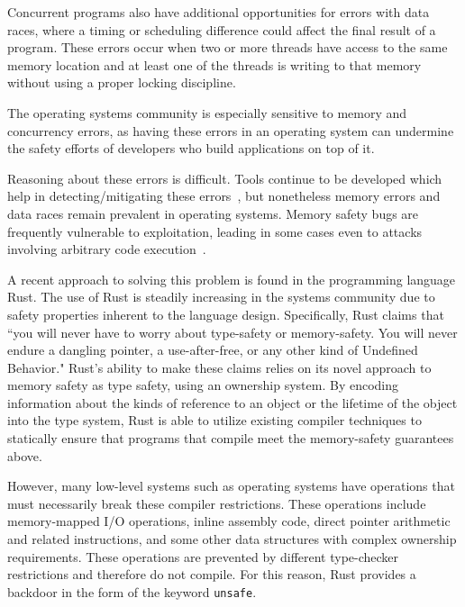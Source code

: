 \documentclass[12pt]{article}
\begin{document}
Concurrent programs also have additional opportunities for errors with data races, where a timing or scheduling difference could affect the final result of a program. These errors occur when two or more threads have access to the same memory location and at least one of the threads is writing to that memory without using a proper locking discipline\cite{placeholder}. 

The operating systems community is especially sensitive to memory and concurrency errors, as having these errors in an operating system can undermine the safety efforts of developers who build applications on top of it.

Reasoning about these errors is difficult. Tools continue to be developed which help in detecting/mitigating these errors~\cite{criswell2009memory, kuvaiskii2017sgxbounds, seyster2011redflag}, but nonetheless memory errors and data races remain prevalent in operating systems. Memory safety bugs are frequently vulnerable to exploitation, leading in some cases even to attacks involving arbitrary code execution~\cite{android_vulnerabilities, shacham2007geometry}.

A recent approach to solving this problem is found in the programming language Rust. The use of Rust is steadily increasing in the systems community due to safety properties inherent to the language design. Specifically, Rust claims that
``you will never have to worry about type-safety or memory-safety. You will never endure a dangling pointer, a use-after-free, or any other kind of Undefined Behavior."\cite{rust_nomicon}
Rust's ability to make these claims relies on its novel approach to memory safety as type safety, using an ownership system. By encoding information about the kinds of reference to an object or the lifetime of the object into the type system, Rust is able to utilize existing compiler techniques to statically ensure that programs that compile meet the memory-safety guarantees above.

However, many low-level systems such as operating systems have operations that must necessarily break these compiler restrictions. These operations include memory-mapped I/O operations, inline assembly code, direct pointer arithmetic and related instructions, and some other data structures with complex ownership requirements. These operations are prevented by different type-checker restrictions and therefore do not compile. For this reason, Rust provides a backdoor in the form of the keyword \texttt{unsafe}.
\end{document}
